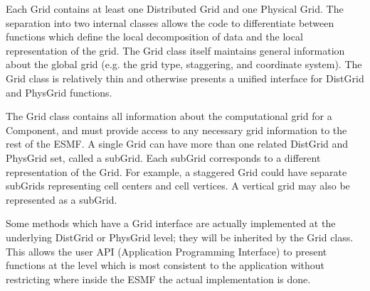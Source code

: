 


Each Grid contains at least one Distributed Grid and one Physical Grid.
The separation into two internal classes allows the code to differentiate
between functions which define the local decomposition of data and
the local representation of the grid.  The Grid class itself maintains
general information about the global grid (e.g. the grid type, staggering,
and coordinate system).  The Grid class is relatively thin and
otherwise presents a unified interface for DistGrid and PhysGrid
functions.

The Grid class contains all information about the computational grid
for a Component, and must provide access to any necessary grid information
to the rest of the ESMF.  A single Grid can have more than one related
DistGrid and PhysGrid set, called a subGrid.  Each subGrid corresponds to
a different representation of the Grid.  For example, a staggered Grid could
have separate subGrids representing cell centers and cell vertices.  A
vertical grid may also be represented as a subGrid.

Some methods which have a Grid interface are actually implemented
at the underlying DistGrid or PhysGrid level; they will be inherited
by the Grid class.  This allows the user API (Application Programming
Interface) to present functions at the level which is most consistent
to the application without restricting where inside the ESMF the actual
implementation is done.
